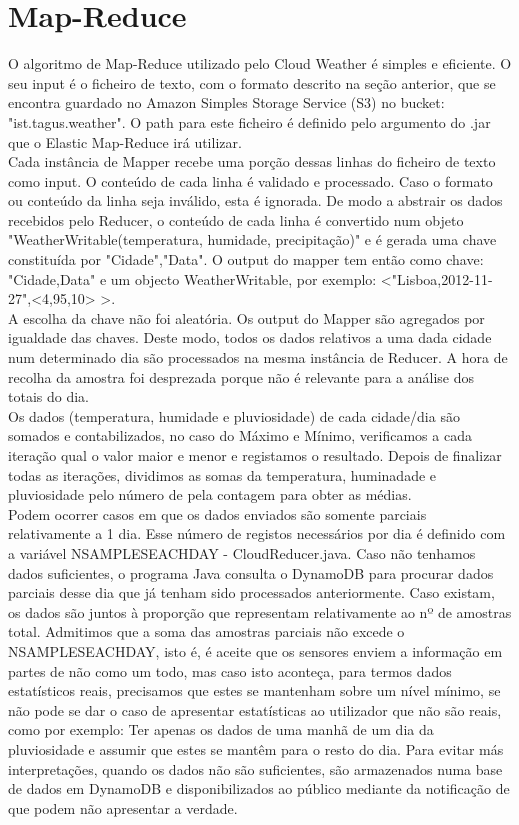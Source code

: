 \section{Map-Reduce}
O algoritmo de Map-Reduce utilizado pelo Cloud Weather é simples e eficiente. O seu input é o ficheiro de texto, com o formato descrito na seção anterior, que se encontra guardado no Amazon Simples Storage Service (S3) no bucket: "ist.tagus.weather". O path para este ficheiro é definido pelo argumento do .jar que o Elastic Map-Reduce irá utilizar.\\
Cada instância de Mapper recebe uma porção dessas linhas do ficheiro de texto como input.  O conteúdo de cada linha é validado e processado. Caso o formato ou conteúdo da linha seja inválido, esta é ignorada. De modo a abstrair os dados recebidos pelo Reducer, o conteúdo de cada linha é convertido num objeto "WeatherWritable(temperatura, humidade, precipitação)" e é gerada uma chave constituída por "Cidade","Data". O output do mapper tem então como chave: "Cidade,Data" e um objecto WeatherWritable, por exemplo: <"Lisboa,2012-11-27",<4,95,10> >.\\
A escolha da chave não foi aleatória. Os output do Mapper são agregados por igualdade das chaves. Deste modo, todos os dados relativos a uma dada cidade num determinado dia são processados na mesma instância de Reducer. A hora de recolha da amostra foi desprezada porque não é relevante para a análise dos totais do dia.\\
Os dados (temperatura, humidade e pluviosidade) de cada cidade/dia são somados e contabilizados, no caso do Máximo e Mínimo, verificamos a cada iteração qual o valor maior e menor e registamos o resultado. Depois de finalizar todas as iterações, dividimos as somas da temperatura, huminadade e pluviosidade pelo número de pela contagem para obter as médias.\\
Podem ocorrer casos em que os dados enviados são somente parciais relativamente a 1 dia. Esse número de registos necessários por dia é definido com a variável  NSAMPLESEACHDAY - CloudReducer.java. Caso não tenhamos dados suficientes, o programa Java consulta o DynamoDB para procurar dados parciais desse dia que já tenham sido processados anteriormente. Caso existam, os dados são juntos à proporção que representam relativamente ao nº de amostras total. Admitimos que a soma das amostras parciais não excede o NSAMPLESEACHDAY, isto é, é aceite que os sensores enviem a informação em partes de não como um todo, mas caso isto aconteça, para termos dados estatísticos reais, precisamos que estes se mantenham sobre um nível mínimo, se não pode se dar o caso de apresentar estatísticas ao utilizador que não são reais, como por exemplo: Ter apenas os dados de uma manhã de um dia da pluviosidade e assumir que estes se mantêm para o resto do dia. Para evitar más interpretações, quando os dados não são suficientes, são armazenados numa base de dados em DynamoDB e disponibilizados ao público mediante da notificação de que podem não apresentar a verdade. \\
